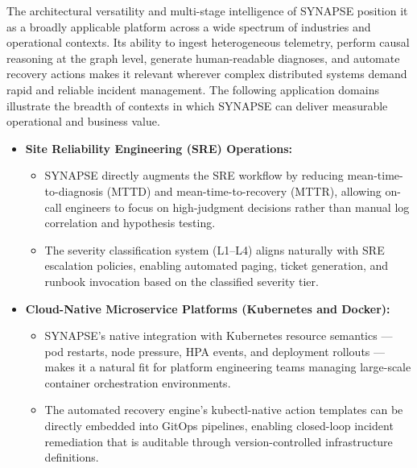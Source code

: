 \hspace*{0.3in} The architectural versatility and multi-stage intelligence of SYNAPSE position it as a broadly applicable platform across a wide spectrum of industries and operational contexts. Its ability to ingest heterogeneous telemetry, perform causal reasoning at the graph level, generate human-readable diagnoses, and automate recovery actions makes it relevant wherever complex distributed systems demand rapid and reliable incident management. The following application domains illustrate the breadth of contexts in which SYNAPSE can deliver measurable operational and business value.\\

\begin{itemize}

    \item \textbf{Site Reliability Engineering (SRE) Operations:}
    \begin{itemize}
        \item SYNAPSE directly augments the SRE workflow by reducing mean-time-to-diagnosis (MTTD) and mean-time-to-recovery (MTTR), allowing on-call engineers to focus on high-judgment decisions rather than manual log correlation and hypothesis testing.
        \item The severity classification system (L1–L4) aligns naturally with SRE escalation policies, enabling automated paging, ticket generation, and runbook invocation based on the classified severity tier.
    \end{itemize}

    \item \textbf{Cloud-Native Microservice Platforms (Kubernetes and Docker):}
    \begin{itemize}
        \item SYNAPSE's native integration with Kubernetes resource semantics — pod restarts, node pressure, HPA events, and deployment rollouts — makes it a natural fit for platform engineering teams managing large-scale container orchestration environments.
        \item The automated recovery engine's kubectl-native action templates can be directly embedded into GitOps pipelines, enabling closed-loop incident remediation that is auditable through version-controlled infrastructure definitions.
    \end{itemize}


\end{itemize}
